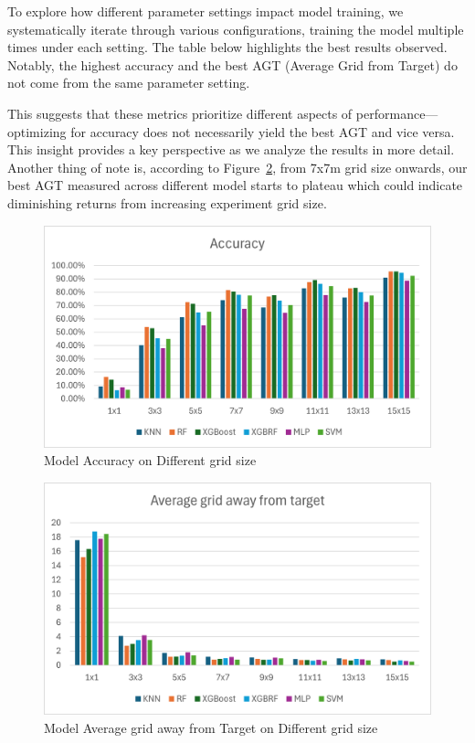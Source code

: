 \documentclass[conference]{IEEEtran}
\begin{document}
	To explore how different parameter settings impact model training, we systematically iterate through various configurations, training the model multiple times under each setting. The table below highlights the best results observed. Notably, the highest accuracy and the best AGT (Average Grid from Target) do not come from the same parameter setting.
	
	
	
	This suggests that these metrics prioritize different aspects of performance—optimizing for accuracy does not necessarily yield the best AGT and vice versa. This insight provides a key perspective as we analyze the results in more detail. Another thing of note is, according to Figure~\ref{fig:AGT_dgrid_size}, from 7x7m grid size onwards, our best AGT measured across different model starts to plateau which could indicate diminishing returns from increasing experiment grid size.
	
	\begin{figure}[htbp]
		\centerline{\includegraphics[scale=0.65]{image3.png}}
		\caption{Model Accuracy on Different grid size}
		\label{fig:acc_dgird_size}
	\end{figure}
	
	\begin{figure}[htbp]
		\centerline{\includegraphics[scale=0.65]{image1.png}}
		\caption{Model Average grid away from Target on Different grid size}
		\label{fig:AGT_dgrid_size}
	\end{figure}
	
\end{document}
